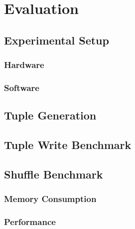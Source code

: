 
\chapter{Evaluation}\label{chapter:evaluation}

\section{Experimental Setup}

\subsection{Hardware}
\subsection{Software}

\section{Tuple Generation}

\section{Tuple Write Benchmark}

\section{Shuffle Benchmark}

\subsection{Memory Consumption}
\subsection{Performance}
